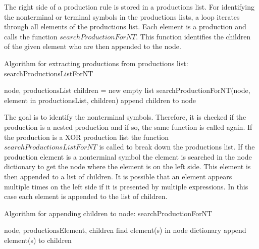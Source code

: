 The right side of a production rule is stored in a productions list.
For identifying the nonterminal or terminal symbols in the productions lists, a loop iterates through all elements of the productions list.
Each element is a production and calls the function $searchProductionForNT$.
This function identifies the children of the given element who are then appended to the node.

\begin{algorithm}[H]
\caption{Algorithm for extracting productions from productions list: searchProductionsListForNT}
\begin{algorithmic}[1] 
\Require node, productionsList
	\State children = new empty list
	\State searchProductionForNT(node, element in productionsList, children)
	\State append children to node
\EndFor
\end{algorithmic}
\end{algorithm}

The goal is to identify the nonterminal symbols.
Therefore, it is checked if the production is a nested production and if so, the same function is called again.
If the production is a XOR production list the function $searchProductionsListForNT$ is called to break down the productions list.
If the production element is a nonterminal symbol the element is searched in the node dictionary to get the node where the element is on the left side.
This element is then appended to a list of children. It is possible that an element appears multiple times on the left side if it is presented by multiple expressions.
In this case each element is appended to the list of children.

\begin{algorithm}[H]
\caption{Algorithm for appending children to node: searchProductionForNT}
\begin{algorithmic}[1] 
\Require node, productionsElement, children
		\State find element(s) in node dictionary
		\State append element(s) to children
	\EndIf
\EndFor
\end{algorithmic}
\end{algorithm}

